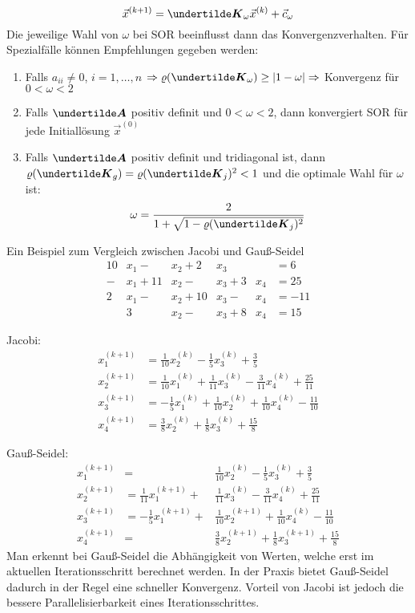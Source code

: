 \begin{enumerate}
	\[\vec{x}^{(k + 1)} = \ma{K}_\omega \vec{x}^{(k)} + \vec{c}_\omega\]
	Die jeweilige Wahl von $\omega$ bei SOR beeinflusst dann das Konvergenzverhalten. Für Spezialfälle können Empfehlungen gegeben werden:
	\begin{enumerate}
		\item Falls $a_{ii} \ne 0$, $i = 1, \dots, n$ $\Rightarrow \varrho(\ma{K}_\omega) \ge |1 - \omega| \Rightarrow$ Konvergenz für $0 < \omega < 2$
		\item Falls $\ma{A}$ positiv definit und $0 < \omega < 2$, dann konvergiert SOR für jede Initiallösung $\vec{x}^{(0)}$
		\item Falls $\ma{A}$ positiv definit und tridiagonal ist, dann $\varrho(\ma{K}_g) = \varrho(\ma{K}_j)^2 < 1$ und die optimale Wahl für $\omega$ ist:
		\[\omega = \frac{2}{1 + \sqrt{1 - \varrho(\ma{K}_j)^2}}\]
	\end{enumerate}
\end{enumerate}
Ein Beispiel zum Vergleich zwischen Jacobi und Gauß-Seidel
\begin{align*}
	10 &x_1 - &x_2 + 2 &x_3 & &= 6 \\
	- &x_1 + 11 &x_2 - &x_3 + 3 &x_4 &= 25 \\
	2 &x_1 - &x_2 + 10 &x_3 - &x_4 &= -11 \\
	& 3 &x_2 - &x_3 + 8 &x_4 &= 15
\end{align*}

Jacobi:
\begin{align*}
	x_1^{(k + 1)} &= \frac{1}{10} x_2^{(k)} - \frac{1}{5} x_3^{(k)} + \frac{3}{5} \\
	x_2^{(k + 1)} &= \frac{1}{10} x_1^{(k)} + \frac{1}{11} x_3^{(k)} - \frac{3}{11} x_4^{(k)} + \frac{25}{11} \\
	x_3^{(k + 1)} &=  -\frac{1}{5} x_1^{(k)} + \frac{1}{10} x_2^{(k)} + \frac{1}{10} x_4^{(k)} - \frac{11}{10} \\
	x_4^{(k + 1)} &= \frac{3}{8} x_2^{(k)} + \frac{1}{8} x_3^{(k)} + \frac{15}{8}
\end{align*}

Gauß-Seidel:
\begin{align*}
	x_1^{(k + 1)} &= & \frac{1}{10} x_2^{(k)} - \frac{1}{5} x_3^{(k)} + \frac{3}{5} \\
	x_2^{(k + 1)} &= \frac{1}{11} x_1^{(k + 1)} + & \frac{1}{11} x_3^{(k)} - \frac{3}{11} x_4^{(k)} + \frac{25}{11} \\
	x_3^{(k + 1)} &= -\frac{1}{5} x_1^{(k + 1)} + & \frac{1}{10} x_2^{(k + 1)} + \frac{1}{10} x_4^{(k)} - \frac{11}{10} \\
	x_4^{(k + 1)} &= & \frac{3}{8} x_2^{(k + 1)} + \frac{1}{8} x_3^{(k + 1)} + \frac{15}{8}
\end{align*}
Man erkennt bei Gauß-Seidel die Abhängigkeit von Werten, welche erst im aktuellen Iterationsschritt berechnet werden. In der Praxis bietet Gauß-Seidel dadurch in der Regel eine schneller Konvergenz. Vorteil von Jacobi ist jedoch die bessere Parallelisierbarkeit eines Iterationsschrittes.

